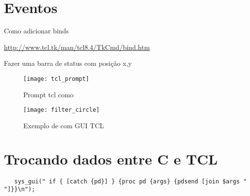 \section{Eventos}

Como adicionar binds

\url{http://www.tcl.tk/man/tcl8.4/TkCmd/bind.htm}

Fazer uma barra de status com posição x,y

\begin{figure}[ht!]
	\centering
	\texttt{[image: tcl\_prompt]}
	\caption{Prompt tcl como \external}
\end{figure}

\begin{figure}[ht!]
	\centering
	\texttt{[image: filter\_circle]}
	\caption{Exemplo de \external com GUI TCL}
\end{figure}


\section{Trocando dados entre C e TCL}

\begin{lstlisting}
   sys_gui(" if { [catch {pd}] } {proc pd {args} {pdsend [join $args " "]}}\n");
\end{lstlisting}

